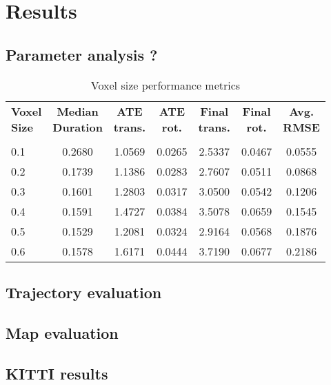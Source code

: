 \chapter{Results}
\label{ch:results}

\section{Parameter analysis ?}

\begin{table}[h]
    \centering
    \begin{tabular}{lcccccc}
        \hline
        \makecell{\textbf{Voxel}                                  \\ \textbf{Size}} &
        \makecell{\textbf{Median}                                 \\ \textbf{Duration}} &
        \makecell{\textbf{ATE}                                    \\ \textbf{trans.}} &
        \makecell{\textbf{ATE}                                    \\ \textbf{rot.}} &
        \makecell{\textbf{Final}                                  \\ \textbf{trans.}} &
        \makecell{\textbf{Final}                                  \\ \textbf{rot.}} &
        \makecell{\textbf{Avg.}                                   \\ \textbf{RMSE}} \\                                                             \\
        \hline
        0.1 & 0.2680 & 1.0569 & 0.0265 & 2.5337 & 0.0467 & 0.0555 \\
        0.2 & 0.1739 & 1.1386 & 0.0283 & 2.7607 & 0.0511 & 0.0868 \\
        0.3 & 0.1601 & 1.2803 & 0.0317 & 3.0500 & 0.0542 & 0.1206 \\
        0.4 & 0.1591 & 1.4727 & 0.0384 & 3.5078 & 0.0659 & 0.1545 \\
        0.5 & 0.1529 & 1.2081 & 0.0324 & 2.9164 & 0.0568 & 0.1876 \\
        0.6 & 0.1578 & 1.6171 & 0.0444 & 3.7190 & 0.0677 & 0.2186 \\
        \hline
    \end{tabular}
    \caption{Voxel size performance metrics}
    \label{tab:voxel_metrics}
\end{table}


\section{Trajectory evaluation}

\section{Map evaluation}

\section{KITTI results}

